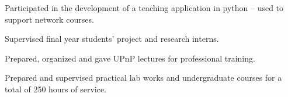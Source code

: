\begin{cvhonors}
  \cventryshort
    {}
    {\begin{cvitems}
        \item {Participated in the development of a teaching application in python -- used to support network courses.}
        \item {Supervised final year students’ project and research interns.}
        \item {Prepared, organized and gave UPnP lectures for professional training.}
        \item {Prepared and supervised practical lab works and undergraduate courses for a total of 250 hours of service.}
      \end{cvitems}
      }
\end{cvhonors}

